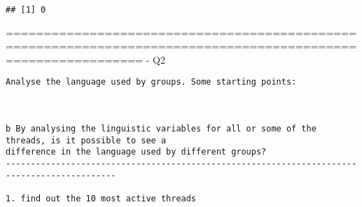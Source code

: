 \documentclass[
]{article}
\newenvironment{Shaded}{\begin{snugshade}}{\end{snugshade}}
\newcommand{\CommentTok}[1]{\textcolor[rgb]{0.56,0.35,0.01}{\textit{#1}}}
\newcommand{\DataTypeTok}[1]{\textcolor[rgb]{0.13,0.29,0.53}{#1}}
\newcommand{\DecValTok}[1]{\textcolor[rgb]{0.00,0.00,0.81}{#1}}
\newcommand{\KeywordTok}[1]{\textcolor[rgb]{0.13,0.29,0.53}{\textbf{#1}}}
\newcommand{\NormalTok}[1]{#1}
\newcommand{\OperatorTok}[1]{\textcolor[rgb]{0.81,0.36,0.00}{\textbf{#1}}}
\newcommand{\OtherTok}[1]{\textcolor[rgb]{0.56,0.35,0.01}{#1}}
\newcommand{\StringTok}[1]{\textcolor[rgb]{0.31,0.60,0.02}{#1}}
\begin{document}
\begin{verbatim}
## [1] 0
\end{verbatim}

\begin{Shaded}
\end{Shaded}

==============================================================================================================
- Q2

\begin{verbatim}
Analyse the language used by groups. Some starting points:



b By analysing the linguistic variables for all or some of the threads, is it possible to see a
difference in the language used by different groups?
--------------------------------------------------------------------------------------------

1. find out the 10 most active threads
\end{verbatim}

\begin{Shaded}
\end{Shaded}
\end{document}
